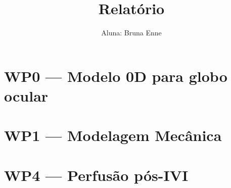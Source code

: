 \documentclass[11pt,a4paper]{article}
\title{Relatório}
\author{Aluna: Bruna Enne}
\date{}
\numberwithin{section}{part}
\numberwithin{subsection}{section}
\begin{document}
\maketitle
\tableofcontents
\clearpage

\part{WP0 --- Modelo 0D para globo ocular}



\clearpage
\part{WP1 --- Modelagem Mecânica}



\clearpage
\part{WP4 --- Perfusão pós-IVI}



\clearpage


\end{document}
